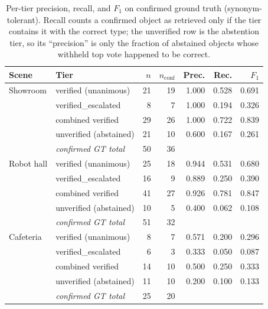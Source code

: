 \begin{table}[t]
\centering
\caption{Per-tier precision, recall, and $F_1$ on confirmed ground truth
(synonym-tolerant). Recall counts a confirmed object as retrieved only if
the tier contains it with the correct type; the unverified row is the
abstention tier, so its ``precision'' is only the fraction of abstained
objects whose withheld top vote happened to be correct.}
\label{tab:tierrf}
\footnotesize
\setlength{\tabcolsep}{3.5pt}
\begin{tabular}{@{}llrrrrr@{}}
\toprule
Scene & Tier & $n$ & $n_{\mathrm{conf}}$ & Prec. & Rec. & $F_1$ \\
\midrule
Showroom & verified (unanimous) & 21 & 19 & 1.000 & 0.528 & 0.691 \\
 & verified\_escalated & 8 & 7 & 1.000 & 0.194 & 0.326 \\
 & combined verified & 29 & 26 & 1.000 & 0.722 & 0.839 \\
 & unverified (abstained) & 21 & 10 & 0.600 & 0.167 & 0.261 \\
 & \emph{confirmed GT total} & 50 & 36 & & & \\
\midrule
Robot hall & verified (unanimous) & 25 & 18 & 0.944 & 0.531 & 0.680 \\
 & verified\_escalated & 16 & 9 & 0.889 & 0.250 & 0.390 \\
 & combined verified & 41 & 27 & 0.926 & 0.781 & 0.847 \\
 & unverified (abstained) & 10 & 5 & 0.400 & 0.062 & 0.108 \\
 & \emph{confirmed GT total} & 51 & 32 & & & \\
\midrule
Cafeteria & verified (unanimous) & 8 & 7 & 0.571 & 0.200 & 0.296 \\
 & verified\_escalated & 6 & 3 & 0.333 & 0.050 & 0.087 \\
 & combined verified & 14 & 10 & 0.500 & 0.250 & 0.333 \\
 & unverified (abstained) & 11 & 10 & 0.200 & 0.100 & 0.133 \\
 & \emph{confirmed GT total} & 25 & 20 & & & \\
\bottomrule
\end{tabular}
\end{table}

